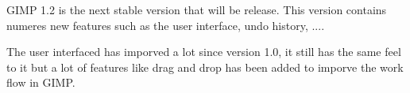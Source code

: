 GIMP 1.2 is the next stable version that will be release. This version contains numeres new features such as the user interface, undo history, .... 

The user interfaced has imporved a lot since version 1.0, it still has the same feel to it but a lot of features like drag and drop has been added to imporve the work flow in GIMP. 
